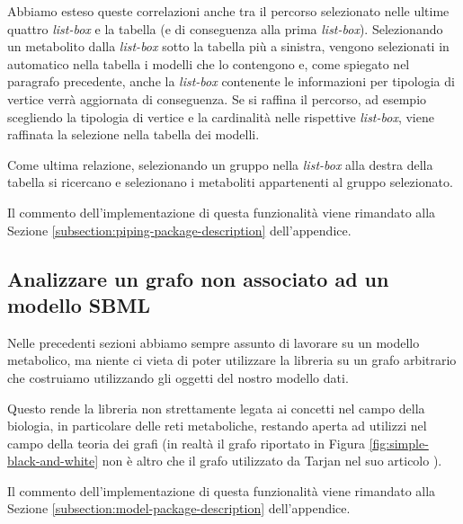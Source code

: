 Abbiamo esteso queste correlazioni anche tra il percorso selezionato
nelle ultime quattro \emph{list-box} e la tabella (e di conseguenza
alla prima \emph{list-box}). Selezionando un metabolito dalla
\emph{list-box} sotto la tabella pi\`u a sinistra, vengono selezionati
in automatico nella tabella i modelli che lo contengono e, come
spiegato nel paragrafo precedente, anche la \emph{list-box} contenente
le informazioni per tipologia di vertice verr\`a aggiornata di
conseguenza. Se si raffina il percorso, ad esempio scegliendo la
tipologia di vertice e la cardinalit\`a nelle rispettive
\emph{list-box}, viene raffinata la selezione nella tabella dei
modelli.

Come ultima relazione, selezionando un gruppo nella \emph{list-box}
alla destra della tabella si ricercano e selezionano i metaboliti
appartenenti al gruppo selezionato.

Il commento dell'implementazione di questa funzionalit\`a viene
rimandato alla Sezione \ref{subsection:piping-package-description}
dell'appendice.

\subsection{Analizzare un grafo non associato ad un modello SBML}
Nelle precedenti sezioni abbiamo sempre assunto di lavorare su un
modello metabolico, ma niente ci vieta di poter utilizzare la libreria
su un grafo arbitrario che costruiamo utilizzando gli oggetti del
nostro modello dati.

Questo rende la libreria non strettamente legata ai concetti nel campo
della biologia, in particolare delle reti metaboliche, restando aperta
ad utilizzi nel campo della teoria dei grafi (in realt\`a il grafo
riportato in Figura \ref{fig:simple-black-and-white} non \`e altro che
il grafo utilizzato da Tarjan nel suo articolo \cite{Tarjan}).

Il commento dell'implementazione di questa funzionalit\`a viene
rimandato alla Sezione \ref{subsection:model-package-description}
dell'appendice.


